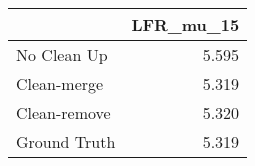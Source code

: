\begin{tabular}{lr}
\toprule
{} & LFR_mu_15 \\
\midrule
No Clean Up  &     5.595 \\
Clean-merge  &     5.319 \\
Clean-remove &     5.320 \\
Ground Truth &     5.319 \\
\bottomrule
\end{tabular}
